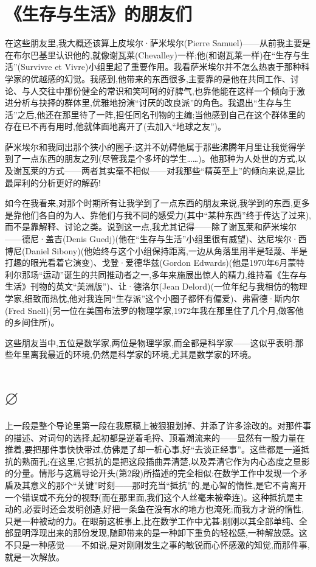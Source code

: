 \section{《生存与生活》的朋友们}

在这些朋友里,我大概还该算上皮埃尔·萨米埃尔(Pierre Samuel)——从前我主要是在布尔巴基里认识他的,就像谢瓦莱(Chevalley)一样;他(和谢瓦莱一样)在“生存与生活”(Survivre et Vivre)小组里起了重要作用。我看萨米埃尔并不怎么热衷于那种科学家的优越感的幻觉。我感到,他带来的东西很多,主要靠的是他在共同工作、讨论、与人交往中那份健全的常识和笑呵呵的好脾气,也靠他能在这样一个倾向于激进分析与抉择的群体里,优雅地扮演“讨厌的改良派”的角色。我退出“生存与生活”之后,他还在那里待了一阵,担任同名刊物的主编;当他感到自己在这个群体里的存在已不再有用时,他就体面地离开了(去加入“地球之友”)。

萨米埃尔和我同出那个狭小的圈子;这并不妨碍他属于那些沸腾年月里让我觉得学到了一点东西的朋友之列(尽管我是个多坏的学生……)。他那种为人处世的方式,以及谢瓦莱的方式——两者其实毫不相似——对我那些“精英至上”的倾向来说,是比最犀利的分析更好的解药!

如今在我看来,对那个时期所有让我学到了一点东西的朋友来说,我学到的东西,更多是靠他们各自的为人、靠他们与我不同的感受力(其中“某种东西”终于传达了过来),而不是靠解释、讨论之类。说到这一点,我尤其记得——除了谢瓦莱和萨米埃尔——德尼·盖吉(Denis Guedj)(他在“生存与生活”小组里很有威望)、达尼埃尔·西博尼(Daniel Sibony)(他始终与这个小组保持距离,一边从角落里用半是轻蔑、半是打趣的眼光看着它演变)、戈登·爱德华兹(Gordon Edwards)(他是1970年6月蒙特利尔那场“运动”诞生的共同推动者之一,多年来施展出惊人的精力,维持着《生存与生活》刊物的英文“美洲版”)、让·德洛尔(Jean Delord)(一位年纪与我相仿的物理学家,细致而热忱,他对我连同“生存派”这个小圈子都怀有偏爱)、弗雷德·斯内尔(Fred Snell)(另一位在美国布法罗的物理学家,1972年我在那里住了几个月,做客他的乡间住所)。

这些朋友当中,五位是数学家,两位是物理学家,而全都是科学家——这似乎表明:那些年里离我最近的环境,仍然是科学家的环境,尤其是数学家的环境。

\section{$\varnothing$}

上一段是整个导论里第一段在我原稿上被狠狠划掉、并添了许多涂改的。对那件事的描述、对词句的选择,起初都是逆着毛捋、顶着潮流来的——显然有一股力量在推着,要把那件事快快带过,仿佛是了却一桩心事,好“去谈正经事”。这些都是一道抵抗的熟面孔;在这里,它抵抗的是把这段插曲弄清楚,以及弄清它作为内心态度之显影的分量。情形与这篇导论开头(第2段)所描述的完全相似:在数学工作中发现一个矛盾及其意义的那个“关键”时刻——那时充当“抵抗”的,是心智的惰性,是它不肯离开一个错误或不充分的视野(而在那里面,我们这个人丝毫未被牵连)。这种抵抗是主动的,必要时还会发明创造,好把一条鱼在没有水的地方也淹死;而我方才说的惰性,只是一种被动的力。在眼前这桩事上,比在数学工作中尤甚:刚刚以其全部单纯、全部显明浮现出来的那份发现,随即带来的是一种卸下重负的轻松感,一种解放感。这不只是一种感觉——不如说,是对刚刚发生之事的敏锐而心怀感激的知觉,而那件事,就是一次解放。

